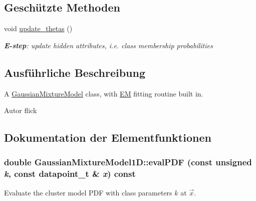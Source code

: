 \subsection*{Geschützte Methoden}
\begin{DoxyCompactItemize}
\item 
\hypertarget{classCDA_1_1GaussianMixtureModel1D_ac8215fdb213641c0cf49eeb2f6d4c045}{
void \hyperlink{classCDA_1_1GaussianMixtureModel1D_ac8215fdb213641c0cf49eeb2f6d4c045}{update\_\-thetas} ()}
\label{classCDA_1_1GaussianMixtureModel1D_ac8215fdb213641c0cf49eeb2f6d4c045}

\begin{DoxyCompactList}\small\item\em {\bfseries E-\/step}: update hidden attributes, i.e. class membership probabilities \item\end{DoxyCompactList}\end{DoxyCompactItemize}


\subsection{Ausführliche Beschreibung}
A \hyperlink{classCDA_1_1GaussianMixtureModel}{GaussianMixtureModel} class, with \hyperlink{classCDA_1_1EM}{EM} fitting routine built in. \begin{DoxyAuthor}{Autor}
flick 
\end{DoxyAuthor}


\subsection{Dokumentation der Elementfunktionen}
\hypertarget{classCDA_1_1GaussianMixtureModel1D_a8d84c546b0e23b84ee662327934b1c8b}{
\subsubsection[{evalPDF}]{\setlength{\rightskip}{0pt plus 5cm}double GaussianMixtureModel1D::evalPDF (const unsigned {\em k}, \/  const {\bf datapoint\_\-t} \& {\em x}) const}}
\label{classCDA_1_1GaussianMixtureModel1D_a8d84c546b0e23b84ee662327934b1c8b}


Evaluate the cluster model PDF with class parameters $k$ at $\vec{x}$. 


